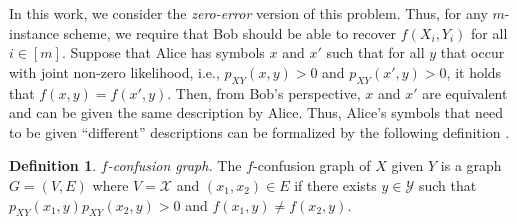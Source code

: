 \documentclass[journal, onecolumn, draftcls]{IEEEtran}
\theoremstyle{definition}
\newtheorem{definition}{Definition}
\newcommand{\calX}{\mathcal{X}}
\newcommand{\calY}{\mathcal{Y}}
\begin{document}
In this work, we consider the {\it zero-error} version of this problem. Thus, for any $m$-instance scheme, we require that Bob should be able to recover $f(X_i, Y_i)$ for all $i \in [m]$.
Suppose that Alice has symbols $x$ and $x'$ such that for all $y$ that occur with joint non-zero likelihood, i.e., $p_{XY}(x,y) > 0$ and $p_{XY}(x',y) > 0$, it holds that $f(x,y) = f(x',y)$. Then, from Bob's perspective, $x$ and $x'$ are equivalent and can be given the same description by Alice. Thus, Alice's symbols that need to be given ``different'' descriptions can be formalized by the following definition \cite{Witsenhausen_76}. 
\begin{definition}
\label{defn:confusion_graph}
{\it $f$-confusion graph.} The $f$-confusion graph of $X$ given $Y$ is a graph $G=(V,E)$ where $V=\calX$ and $(x_1,x_2) \in E$ if there exists $y \in \calY$ such that $p_{XY}(x_1,y) p_{XY}(x_2, y) > 0$ and $f(x_1, y) \neq f(x_2, y)$. 

\begin{figure}[!t]
\begin{center}




\end{center}
\end{figure}
\end{definition}
\end{document}
